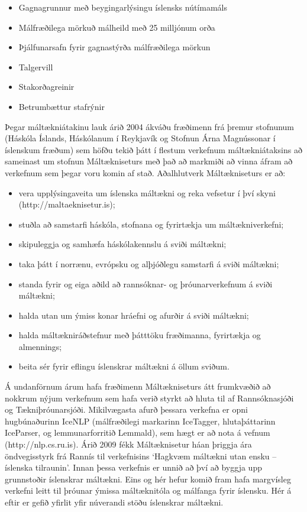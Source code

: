 \documentclass{../../metanetpaper}
\begin{document}
\begin{multicols}{2}
\begin{itemize}
\item Gagnagrunnur með beygingarlýsingu íslensks nútímamáls
\item Málfræðilega mörkuð málheild með 25 milljónum orða 
\item Þjálfunarsafn fyrir gagnastýrða málfræðilega mörkun
\item Talgervill
\item Stakorðagreinir 
\item Betrumbættur stafrýnir
\end{itemize}

Þegar máltækniátakinu lauk árið 2004 ákváðu fræðimenn frá þremur stofnunum (Háskóla Íslands, Háskólanum í Reykjavík og Stofnun Árna Magnússonar í íslenskum fræðum) sem höfðu tekið þátt í flestum verkefnum máltækniátaksins að sameinast um stofnun Máltækniseturs með það að markmiði að vinna áfram að verkefnum sem þegar voru komin af stað. Aðalhlutverk Máltækniseturs er að:

\begin{itemize}
\item vera upplýsingaveita um íslenska máltækni og reka vefsetur í því skyni (http://maltaeknisetur.is); 
\item stuðla að samstarfi háskóla, stofnana og fyrirtækja um máltækniverkefni;
\item skipuleggja og samhæfa háskólakennslu á sviði máltækni;
\item taka þátt í norrænu, evrópsku og alþjóðlegu samstarfi á sviði máltækni;
\item standa fyrir og eiga aðild að rannsóknar- og þróunarverkefnum á sviði máltækni;
\item halda utan um ýmiss konar hráefni og afurðir á sviði máltækni;
\item halda máltækniráðstefnur með þátttöku fræðimanna, fyrirtækja og almennings;
\item beita sér fyrir eflingu íslenskrar máltækni á öllum sviðum.
\end{itemize}

Á undanförnum árum hafa fræðimenn Máltækniseturs átt frumkvæðið að nokkrum nýjum verkefnum sem hafa verið styrkt að hluta til af Rannsóknasjóði og Tækniþróunarsjóði. Mikilvægasta afurð þessara verkefna er opni hugbúnaðurinn IceNLP (málfræðilegi markarinn IceTagger, hlutaþáttarinn IceParser, og lemmunarforritið Lemmald)\cite{icenlp1}, sem hægt er að nota á vefnum (http://nlp.cs.ru.is). Árið 2009 fékk Máltæknisetur háan þriggja ára öndvegisstyrk frá Rannís til verkefnisins ‘Hagkvæm máltækni utan ensku -- íslenska tilraunin’. Innan þessa verkefnis er unnið að því að byggja upp grunnstoðir íslenskrar máltækni.
Eins og hér hefur komið fram hafa margvísleg verkefni leitt til þróunar ýmissa máltæknitóla og málfanga fyrir íslensku. Hér á eftir er gefið yfirlit yfir núverandi stöðu íslenskrar máltækni.


\end{multicols}
\end{document}
